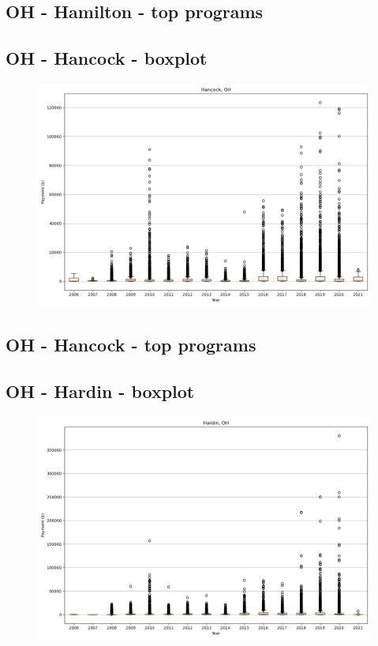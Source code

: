 \subsection*{OH - Hamilton - top programs}

\newpage
\subsection*{OH - Hancock - boxplot}
\begin{figure}[h]
\centering
\includegraphics[width=7in]{../output/boxplots/counties/Hancock-OH_boxplot.png}
\end{figure}


\subsection*{OH - Hancock - top programs}

\newpage
\subsection*{OH - Hardin - boxplot}
\begin{figure}[h]
\centering
\includegraphics[width=7in]{../output/boxplots/counties/Hardin-OH_boxplot.png}
\end{figure}


